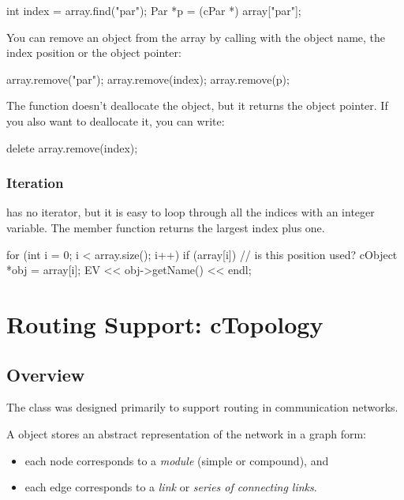 \begin{cpp}
int index = array.find("par");
Par *p = (cPar *) array["par"];
\end{cpp}

You can remove an object from the array by calling 
with the object name, the index position or the object pointer:

\begin{cpp}
array.remove("par");
array.remove(index);
array.remove(p);
\end{cpp}


The  function doesn't deallocate the object, but it
returns the object pointer. If you also want to deallocate it, you can
write:

\begin{cpp}
delete array.remove(index);
\end{cpp}

\subsubsection{Iteration}
\label{sec:sim-lib:carray-iteration}

 has no iterator, but it is easy to loop through all the
indices with an integer variable. The  member function
returns the largest index plus one.

\begin{cpp}
for (int i = 0; i < array.size(); i++) {
  if (array[i]) { // is this position used?
    cObject *obj = array[i];
    EV << obj->getName() << endl;
  }
}
\end{cpp}




\section{Routing Support: cTopology}
\label{sec:sim-lib:ctopology}

\subsection{Overview}
\label{sec:sim-lib:ctopology-overview}

The  class was designed primarily to support
routing in communication networks.

A  object stores an abstract representation of the
network in a graph form:
\begin{itemize}
  \item each  node corresponds to a \textit{module}
    (simple or compound), and
  \item each  edge corresponds to a \textit{link} or
    \textit{series of connecting links}.
\end{itemize}

